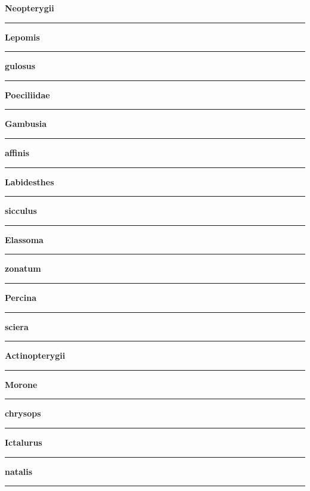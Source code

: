 \documentclass[11pt]{exam}
\newcommand*\Matching[1]{
\ifprintanswers
	\textbf{#1}
\else
	\rule{2.1in}{0.4pt}
\fi
}
\newlength\matchlena
\newlength\matchlenb
\newcommand\MatchQuestion[2]{%
	\setlength\matchlenb{\linewidth}
	\addtolength\matchlenb{-\matchlena}
	\parbox[t]{\matchlena}{\Matching{#1}}\enspace\parbox[t]{\matchlenb}{#2}}
\begin{document}
\begin{questions}
\newpage

\begin{multicols}{2}
	
	\question\MatchQuestion{Neopterygii}{}
	\vspace{1.5\baselineskip}
	
	\question\MatchQuestion{Lepomis}{}
	\vspace{1.5\baselineskip}
	
	\question\MatchQuestion{gulosus}{}
	\vspace{1.5\baselineskip}
	
	\question\MatchQuestion{Poeciliidae}{}
	\vspace{1.5\baselineskip}
	
	\question\MatchQuestion{Gambusia}{}
	\vspace{1.5\baselineskip}
	
	\question\MatchQuestion{affinis}{}
	\vspace{1.5\baselineskip}
	
	\question\MatchQuestion{Labidesthes}{}
	\vspace{1.5\baselineskip}
	
	\question\MatchQuestion{sicculus}{}
	\vspace{1.5\baselineskip}
	
	\question\MatchQuestion{Elassoma}{}
	\vspace{1.5\baselineskip}
	
	\question\MatchQuestion{zonatum}{}
	\columnbreak
	
	\question\MatchQuestion{Percina}{}
	\vspace{1.5\baselineskip}
	
	\question\MatchQuestion{sciera}{}
	\vspace{1.5\baselineskip}
	
	\question\MatchQuestion{Actinopterygii}{}
	\vspace{1.5\baselineskip}
	
	\question\MatchQuestion{Morone}{}
	\vspace{1.5\baselineskip}
	
	\question\MatchQuestion{chrysops}{}
	\vspace{1.5\baselineskip}
	
	\question\MatchQuestion{Ictalurus}{}
	\vspace{1.5\baselineskip}
	
	\question\MatchQuestion{natalis}{}
	\vspace{1.5\baselineskip}
	

\end{multicols}
\end{questions}
\end{document}
